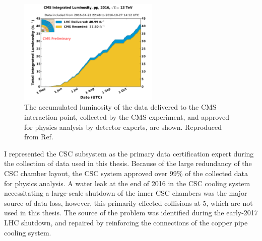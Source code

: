 \begin{figure}[htbp]
  \centering
   \includegraphics[width=0.6\textwidth]{figures/LHCandCMS/int_lumi_per_day_cumulative_pp_2016.pdf}
  \caption[The accumulated luminosity of the delivered, collected, and certifed data used in this analysis]{
    The accumulated luminosity of the data delivered to the CMS interaction point, 
    collected by the CMS experiment, and approved for physics analysis by detector
    experts, are shown. Reproduced from Ref.~\cite{lumiTwiki}
        }
 \label{fig:lumi}
\end{figure}

I represented the CSC subsystem as the primary data certification expert during 
the collection of data used in this thesis.
Because of the large redundancy of the CSC chamber layout, the CSC system approved over 99\% of the
collected data for physics analysis. A water leak at the end of 2016 in the CSC cooling system 
necessitating a large-scale shutdown of the inner 
CSC chambers was the major source of data loss, however, this primarily effected \pp collisions
at 5\TeV, which are not used in this thesis. The source of the problem was identified during
the early-2017 LHC shutdown, and repaired by reinforcing the connections of the copper pipe cooling system.
